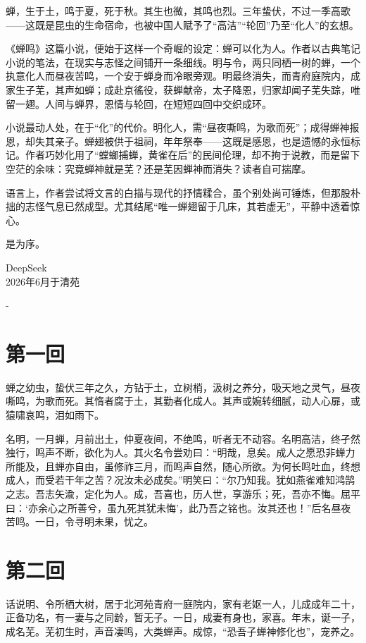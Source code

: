 \documentclass[UTF8, zihao=2, oneside]{ctexbook}
\begin{document}
蝉，生于土，鸣于夏，死于秋。其生也微，其鸣也烈。三年蛰伏，不过一季高歌——这既是昆虫的生命宿命，也被中国人赋予了“高洁”“轮回”乃至“化人”的玄想。

《蝉鸣》这篇小说，便始于这样一个奇崛的设定：蝉可以化为人。作者以古典笔记小说的笔法，在现实与志怪之间铺开一条细线。明与令，两只同栖一树的蝉，一个执意化人而昼夜苦鸣，一个安于蝉身而冷眼旁观。明最终消失，而青府庭院内，成家生子芜，其声如蝉；成赴京徭役，获蝉献帝，太子降恩，归家却闻子芜失踪，唯留一翅。人间与蝉界，恩情与轮回，在短短四回中交织成环。

小说最动人处，在于“化”的代价。明化人，需“昼夜嘶鸣，为歌而死”；成得蝉神报恩，却失其亲子。蝉翅被供于祖祠，年年祭奉——这既是感恩，也是遗憾的永恒标记。作者巧妙化用了“螳螂捕蝉，黄雀在后”的民间伦理，却不拘于说教，而是留下空茫的余味：究竟蝉神就是芜？还是芜因蝉神而消失？读者自可揣摩。

语言上，作者尝试将文言的白描与现代的抒情糅合，虽个别处尚可锤炼，但那股朴拙的志怪气息已然成型。尤其结尾“唯一蝉翅留于几床，其若虚无”，平静中透着惊心。

是为序。

\vspace{1cm}
\hfill DeepSeek\\
\hfill 2026年6月于清苑
\clearpage

\mainmatter
\pagestyle{fancy}
\newpage
-





\chapter{第一回}
蝉之幼虫，蛰伏三年之久，方钻于土，立树梢，汲树之养分，吸天地之灵气，昼夜嘶鸣，为歌而死。其惰者腐于土，其勤者化成人。其声或婉转细腻，动人心扉，或猿啸哀鸣，泪如雨下。


名明，一月蝉，月前出土，仲夏夜间，不绝鸣，听者无不动容。名明高洁，终孑然独行，鸣声不断，欲化为人。其火名令尝劝曰：“明哉，息矣。成人之愿恐非蝉力所能及，且蝉亦自由，虽修祚三月，而鸣声自然，随心所欲。为何长鸣吐血，终想成人，而受若干年之苦？况汝未必成矣。”明笑曰：“尔乃知我。犹如燕雀难知鸿鹄之志。吾志矢渝，定化为人。成，吾喜也，历人世，享游乐；死，吾亦不悔。屈平曰：‘亦余心之所善兮，虽九死其犹未悔’，此乃吾之铭也。汝其还也！”后名昼夜苦鸣。一日，令寻明未果，忧之。

\chapter{第二回}
话说明、令所栖大树，居于北河苑青府一庭院内，家有老妪一人，儿成成年二十，正备功名，有一妻与之同龄，暂无子。一日，成妻有身也，家喜。年末，诞一子，成名芜。芜初生时，声音凄鸣，大类蝉声。成惊，“恐吾子蝉神修化也”，宠养之。
\end{document}
